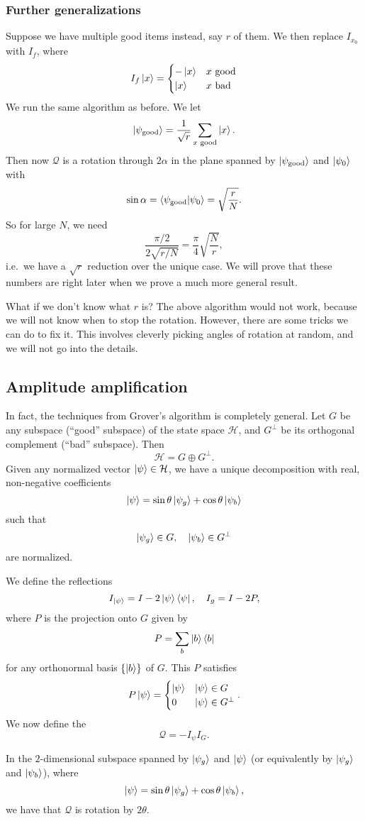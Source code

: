 \subsubsection*{Further generalizations}
Suppose we have multiple good items instead, say $r$ of them. We then replace $I_{x_0}$ with $I_f$, where
\[
  I_f \left\lvert x\right\rangle =
  \begin{cases}
    -\left\lvert x\right\rangle & x\text{ good}\\
    \left\lvert x\right\rangle & x\text{ bad}
  \end{cases}
\]
We run the same algorithm as before. We let
\[
  \left\lvert \psi_{\mathrm{good}}\right\rangle = \frac{1}{\sqrt{r}} \sum_{x\text{ good}} \left\lvert x\right\rangle.
\]
Then now $\mathcal{Q}$ is a rotation through $2\alpha$ in the plane spanned by $\left\lvert \psi_{\mathrm{good}}\right\rangle$ and $\left\lvert \psi_0\right\rangle$ with
\[
  \sin \alpha = \left\langle \psi_{\mathrm{good}}\middle\vert \psi_0 \right\rangle = \sqrt{\frac{r}{N}}.
\]
So for large $N$, we need
\[
  \frac{\pi/2}{2\sqrt{r/N}} = \frac{\pi}{4} \sqrt{\frac{N}{r}},
\]
i.e.\ we have a $\sqrt{r}$ reduction over the unique case. We will prove that these numbers are right later when we prove a much more general result.

What if we don't know what $r$ is? The above algorithm would not work, because we will not know when to stop the rotation. However, there are some tricks we can do to fix it. This involves cleverly picking angles of rotation at random, and we will not go into the details.

\subsection{Amplitude amplification}
In fact, the techniques from Grover's algorithm is completely general. Let $G$ be any subspace (``good'' subspace) of the state space $\mathcal{H}$, and $G^\perp$ be its orthogonal complement (``bad'' subspace). Then
\[
  \mathcal{H} = G \oplus G^\perp.
\]
Given any normalized vector $\left\lvert \psi\right\rangle \in \mathcal{H}$, we have a unique decomposition with real, non-negative coefficients
\[
  \left\lvert \psi\right\rangle = \sin \theta \left\lvert \psi_g\right\rangle + \cos \theta \left\lvert \psi_b\right\rangle
\]
such that
\[
  \left\lvert \psi_g\right\rangle \in G,\quad \left\lvert \psi_b\right\rangle \in G^\perp
\]
are normalized.

We define the reflections
\[
  I_{\left\lvert \psi\right\rangle} = I -2\left\lvert \psi\right\rangle\left\langle \psi \right\rvert, \quad I_g = I - 2P,
\]
where $P$ is the projection onto $G$ given by
\[
  P = \sum_b \left\lvert b\right\rangle\left\langle b \right\rvert
\]
for any orthonormal basis $\{\left\lvert b\right\rangle\}$ of $G$. This $P$ satisfies
\[
  P \left\lvert \psi\right\rangle =
  \begin{cases}
    \left\lvert \psi\right\rangle & \left\lvert \psi\right\rangle \in G\\
    0 & \left\lvert \psi\right\rangle \in G^\perp
  \end{cases}.
\]
We now define the 
\[
  \mathcal{Q} = - I_\psi I_G.
\]
\begin{thm}
  In the $2$-dimensional subspace spanned by $\left\lvert \psi_g\right\rangle$ and $\left\lvert \psi\right\rangle$ (or equivalently by $\left\lvert \psi_g\right\rangle$ and $\left\lvert \psi_b\right\rangle$), where
  \[
    \left\lvert \psi\right\rangle = \sin \theta \left\lvert \psi_g\right\rangle + \cos \theta \left\lvert \psi_b\right\rangle,
  \]
  we have that $\mathcal{Q}$ is rotation by $2 \theta$.
\end{thm}

